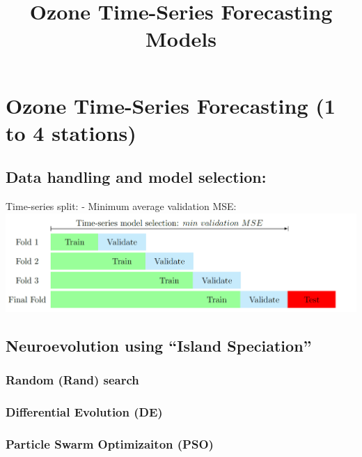 \documentclass[11pt]{article}
\title{Ozone Time-Series Forecasting Models}
\makeatletter
\def\maxwidth{\ifdim\Gin@nat@width>\linewidth\linewidth
    \else\Gin@nat@width\fi}
\let\Oldincludegraphics\includegraphics
\renewcommand{\includegraphics}[1]{\Oldincludegraphics[width=.8\maxwidth]{#1}}
\makeatother
\begin{document}
    
    
    \maketitle
    
    

    
    \hypertarget{ozone-time-series-forecasting-1-to-4-stations}{%
\section{Ozone Time-Series Forecasting (1 to 4
stations)}\label{ozone-time-series-forecasting-1-to-4-stations}}

    \hypertarget{data-handling-and-model-selection}{%
\subsection{Data handling and model
selection:}\label{data-handling-and-model-selection}}

    Time-series split: - Minimum average validation MSE:
\includegraphics{pics/timeSeriesValidateSplit.png}

    \hypertarget{neuroevolution-using-island-speciation}{%
\subsection{Neuroevolution using ``Island
Speciation''}\label{neuroevolution-using-island-speciation}}

    \hypertarget{random-rand-search}{%
\subsubsection{Random (Rand) search}\label{random-rand-search}}

    \hypertarget{differential-evolution-de}{%
\subsubsection{Differential Evolution
(DE)}\label{differential-evolution-de}}

    \hypertarget{particle-swarm-optimizaiton-pso}{%
\subsubsection{Particle Swarm Optimizaiton
(PSO)}\label{particle-swarm-optimizaiton-pso}}
\end{document}

